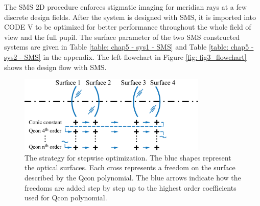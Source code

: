 The SMS 2D procedure enforces stigmatic imaging for meridian rays at a few discrete design fields. After the system is designed with SMS, it is imported into CODE V to be optimized for better performance throughout the whole field of view and the full pupil. The surface parameter of the two SMS constructed systems are given in Table \ref{table: chap5 - sys1 - SMS} and Table \ref{table: chap5 - sys2 - SMS} in the appendix. The left flowchart in Figure \ref{fig: fig3_flowchart} shows the design flow with SMS. 

\begin{figure}[h!]
    \centering
    \includegraphics[width=0.8\textwidth]{chapter-5/figures/Figure4_stepwise.png}
    \caption{The strategy for stepwise optimization. The blue shapes represent the optical surfaces. Each cross represents a freedom on the surface described by the Qcon polynomial. The blue arrows indicate how the freedoms are added step by step up to the highest order coefficients used for Qcon polynomial. }
    \label{fig: fig4_stepwiseflow}
\end{figure}


